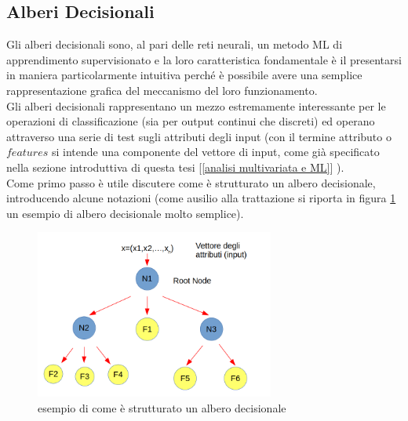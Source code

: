 \newpage

\subsection{Alberi Decisionali}
\label{alberi decisionali}
Gli alberi decisionali sono, al pari delle reti neurali, un metodo ML di apprendimento supervisionato e  la loro caratteristica fondamentale è il presentarsi in maniera particolarmente intuitiva perché è possibile avere una semplice rappresentazione grafica del meccanismo del loro funzionamento.\\
Gli alberi decisionali rappresentano un mezzo estremamente interessante per le operazioni di classificazione (sia per output continui che discreti) ed operano attraverso una serie di test sugli attributi degli input (con il termine attributo o $\textit{features}$ si intende una componente del vettore di input, come già specificato nella sezione introduttiva di questa tesi [\ref{analisi multivariata e ML}] ). \\ 
Come primo passo è utile discutere come è strutturato un albero decisionale, introducendo alcune notazioni (come ausilio alla trattazione si riporta in figura \ref{schemaDT} un esempio di albero decisionale molto semplice). \\

\begin{figure} [h!]
	\centering
	\includegraphics[width=0.70\textwidth]{figs/schemaDT.png}
	\caption{esempio di come è strutturato un albero decisionale}
	\label{schemaDT}
\end{figure} 

